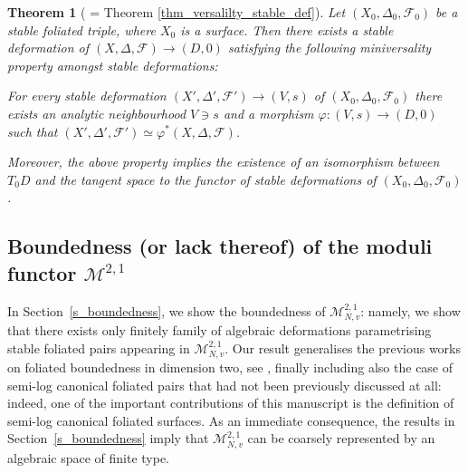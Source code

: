 \documentclass[12pt, a4paper]{amsart}
\newcommand\CC{\mathbb{C}}
\newcommand\FF{\mathcal{F}}
\newcounter{Theorem}
\newtheorem{theorem}{Theorem}[section]
\theoremstyle{definition}
\theoremstyle{named}
\begin{document}

\begin{theorem}[ = Theorem \ref{thm_versalilty_stable_def}]
    Let $(X_0,\Delta_0,\FF_0)$ be a stable foliated triple, where $X_0$ is a surface. 
    Then there exists a  stable deformation of $(X,\Delta,\FF)\to (D,0)$ satisfying the following miniversality property amongst stable deformations:
    
    For every stable deformation $(X',\Delta',\FF')\to (V,s)$ of $(X_0,\Delta_0,\FF_0)$ there exists an analytic neighbourhood $V\ni s$ and a morphism $\varphi: (V,s)\to (D,0)$ such that $(X',\Delta',\FF')\simeq \varphi^*(X,\Delta,\FF)$. 
    
    Moreover, the above property implies the existence of an isomorphism between $T_0D$ and the tangent space to the functor of stable deformations of $(X_0,\Delta_0,\FF_0)$.
\end{theorem}

\subsection{Boundedness (or lack thereof) of the moduli functor $\mathcal M^{2,1}$}

In Section~\ref{s_boundedness}, we show the boundedness of $\mathcal M^{2,1}_{N, v}$: namely, we show that there exists only finitely family of algebraic deformations parametrising stable foliated pairs appearing in 
$\mathcal M^{2,1}_{N, v}$.
Our result generalises the previous works on foliated boundedness in dimension two, see \cite{HL19, chen21, SS23}, finally including also the case of semi-log canonical foliated pairs that had not been previously discussed at all:
indeed, one of the important contributions of this manuscript is the definition of semi-log canonical foliated surfaces.
As an immediate consequence, the results in Section~\ref{s_boundedness} imply that 
$\mathcal M^{2,1}_{N, v}$ 
can be coarsely represented by an algebraic space of finite type.
\end{document}
